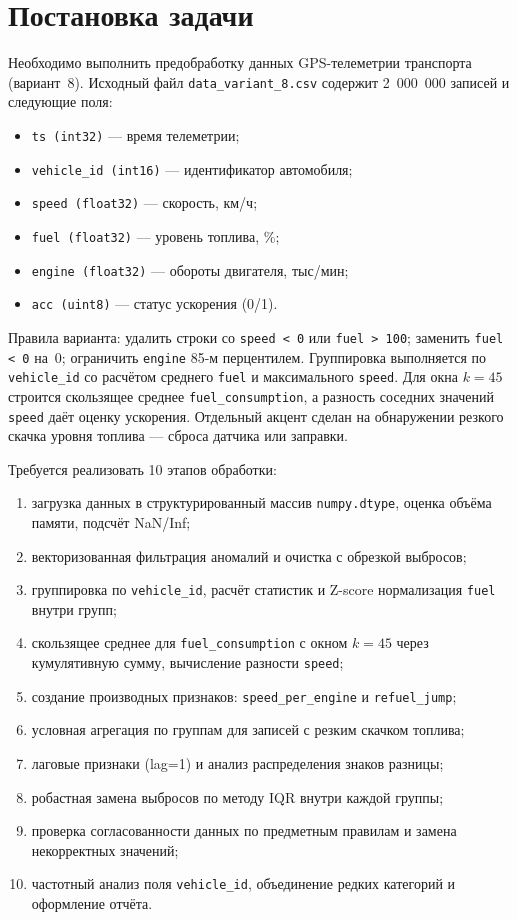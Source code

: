 \documentclass[oneside,a4paper,14pt]{extarticle}
\begin{document}
\section*{Постановка задачи}
Необходимо выполнить предобработку данных GPS-телеметрии транспорта (вариант~8). Исходный файл \texttt{data\_variant\_8.csv} содержит 2~000~000 записей и следующие поля:
\begin{itemize}[leftmargin=*]
	\item \texttt{ts (int32)} --- время телеметрии;
	\item \texttt{vehicle\_id (int16)} --- идентификатор автомобиля;
	\item \texttt{speed (float32)} --- скорость, км/ч;
	\item \texttt{fuel (float32)} --- уровень топлива, \%;
	\item \texttt{engine (float32)} --- обороты двигателя, тыс/мин;
	\item \texttt{acc (uint8)} --- статус ускорения (0/1).
\end{itemize}

Правила варианта: удалить строки со \texttt{speed < 0} или \texttt{fuel > 100}; заменить \texttt{fuel < 0} на~0; ограничить \texttt{engine} 85-м перцентилем. Группировка выполняется по \texttt{vehicle\_id} со расчётом среднего \texttt{fuel} и максимального \texttt{speed}. Для окна $k=45$ строится скользящее среднее \texttt{fuel\_consumption}, а разность соседних значений \texttt{speed} даёт оценку ускорения. Отдельный акцент сделан на обнаружении резкого скачка уровня топлива --- сброса датчика или заправки.

Требуется реализовать 10 этапов обработки:
\begin{enumerate}[leftmargin=*]
	\item загрузка данных в структурированный массив \texttt{numpy.dtype}, оценка объёма памяти, подсчёт NaN/Inf;
	\item векторизованная фильтрация аномалий и очистка с обрезкой выбросов;
	\item группировка по \texttt{vehicle\_id}, расчёт статистик и Z-score нормализация \texttt{fuel} внутри групп;
	\item скользящее среднее для \texttt{fuel\_consumption} с окном $k=45$ через кумулятивную сумму, вычисление разности \texttt{speed};
	\item создание производных признаков: \texttt{speed\_per\_engine} и \texttt{refuel\_jump};
	\item условная агрегация по группам для записей с резким скачком топлива;
	\item лаговые признаки (lag=1) и анализ распределения знаков разницы;
	\item робастная замена выбросов по методу IQR внутри каждой группы;
	\item проверка согласованности данных по предметным правилам и замена некорректных значений;
	\item частотный анализ поля \texttt{vehicle\_id}, объединение редких категорий и оформление отчёта.
\end{enumerate}
\end{document}
